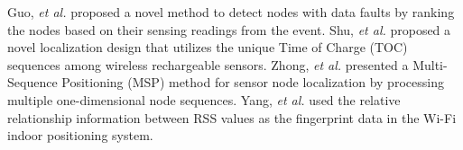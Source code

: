 Guo, \emph{et al.} \cite{guo2014detecting}  proposed a novel method to detect nodes with data faults by ranking the nodes based on their sensing
readings from the event.
Shu, \emph{et al.} \cite{shu2015toc}  proposed a novel localization design that utilizes the unique Time of Charge (TOC) sequences among wireless rechargeable sensors.
Zhong, \emph{et al.} \cite{zhong2012wireless} presented a Multi-Sequence Positioning (MSP) method for  sensor node localization by processing multiple one-dimensional node sequences.
Yang, \emph{et al.} \cite{yang2013freeloc} used the relative relationship information between RSS values as the fingerprint data in the Wi-Fi indoor positioning system.




